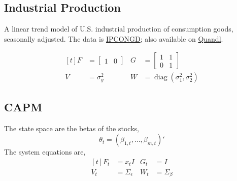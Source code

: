 \documentclass{article}\usepackage[]{graphicx}\usepackage[]{color}
\DeclareMathOperator{\diag}{diag}
\begin{document}
\subsection{Industrial Production}

A linear trend model of U.S. industrial production of consumption goods, seasonally adjusted.
The data is \href{http://research.stlouisfed.org/fred2/series/IPCONGD}{IPCONGD}; also available on \href{http://www.quandl.com/FRED/IPCONGD}{Quandl}.

\begin{equation*}
  \begin{aligned}[t]
    F &=
    \begin{bmatrix}
      1 & 0 
    \end{bmatrix}
    & 
    G &=
    \begin{bmatrix}
      1 & 1 \\
      0 & 1 
    \end{bmatrix}
    \\
    V & = \sigma_{y}^{2} &
    W & = \diag (\sigma_{1}^{2}, \sigma_{2}^{2})
  \end{aligned}
\end{equation*}

\subsection{CAPM}

The state space are the betas of the stocks,
\begin{equation}
  \theta_{t} = (\beta_{1,t}, \dots, \beta_{m,t})'
\end{equation}
The system equations are,
\begin{equation}
  \begin{aligned}[t]
    F_{t} &= x_{t} I & G_{t} &= I \\
    V_{t} &= \Sigma_{\epsilon} & W_{t} &= \Sigma_{\beta}
  \end{aligned}
\end{equation}

\printbibliography{}
\end{document}
